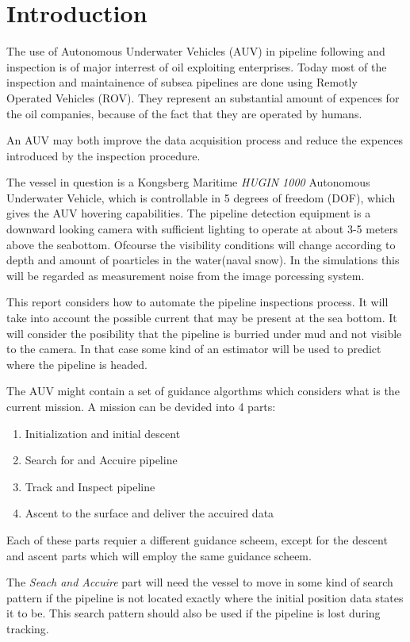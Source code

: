 \chapter{Introduction}

	The use of Autonomous Underwater Vehicles (AUV) in pipeline following and inspection is of major interrest of oil exploiting enterprises. Today most of the inspection and maintainence of subsea pipelines are done using Remotly Operated Vehicles (ROV). They represent an substantial amount of expences for the oil companies, because of the fact that they are operated by humans. 
	
	An AUV may both improve the data acquisition process and reduce the expences introduced by the inspection procedure. 
	
	The vessel in question is a Kongsberg Maritime \textit{HUGIN 1000} Autonomous Underwater Vehicle, which is controllable in 5 degrees of freedom (DOF), which gives the AUV hovering capabilities. The pipeline detection equipment is a downward looking camera with sufficient lighting to operate at about 3-5 meters above the seabottom. Ofcourse the visibility conditions will change according to depth and amount of poarticles in the water(naval snow). In the simulations this will be regarded as measurement noise from the image porcessing system. 
	
	This report considers how to automate the pipeline inspections process. It will take into account the possible current that may be present at the sea bottom. It will consider the posibility that the pipeline is burried under mud and not visible to the camera. In that case some kind of an estimator will be used to predict where the pipeline is headed.
	
	The AUV might contain a set of guidance algorthms which considers what is the current mission. A mission can be devided into 4 parts:
	\begin{enumerate}
	 \item Initialization and initial descent
	 \item Search for and Accuire pipeline
	 \item Track and Inspect pipeline
	 \item Ascent to the surface and deliver the accuired data
	\end{enumerate}
	Each of these parts requier a different guidance scheem, except for the descent and ascent parts which will employ the same guidance scheem. 
	
	The \textit{Seach and Accuire} part will need the vessel to move in some kind of search pattern if the pipeline is not located exactly where the initial position data states it to be. This search pattern should also be used if the pipeline is lost during tracking. 
	

